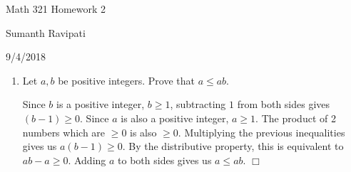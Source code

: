 \documentclass[12pt,letterpaper,reqno]{amsart}
\begin{document}
%
\centerline{\Large Math 321 Homework 2}
\centerline{Sumanth Ravipati}
\centerline{9/4/2018}
\vspace{.25in}

\begin{enumerate}
\item Let $a, b$ be positive integers. Prove that $a \leq ab$.

\begin{flushleft}Since $b$ is a positive integer, $b \geq 1$, subtracting $1$ from both sides gives $(b - 1) \geq 0$. Since $a$ is also a positive integer, $a \geq 1$. The product of 2 numbers which are $\geq 0$ is also $\geq 0$. Multiplying the previous inequalities gives us $a(b-1) \geq 0$. By the distributive property, this is equivalent to $ab - a \geq 0$. Adding $a$ to both sides gives us $a \leq ab$. $\Box$
\end{flushleft}


\end{enumerate}
\end{document}

